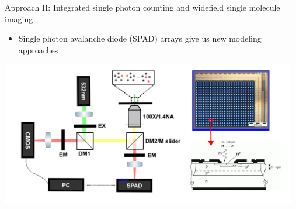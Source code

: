 \documentclass{beamer}					%
\begin{document}
\begin{frame}{Approach II: Integrated single photon counting and widefield single molecule imaging}
\begin{itemize}
\item Single photon avalanche diode (SPAD) arrays give us new modeling approaches
\end{itemize}
\includegraphics[width=13cm]{../../spad/spad/media/SPADD.png}
\end{frame}

\end{document}

